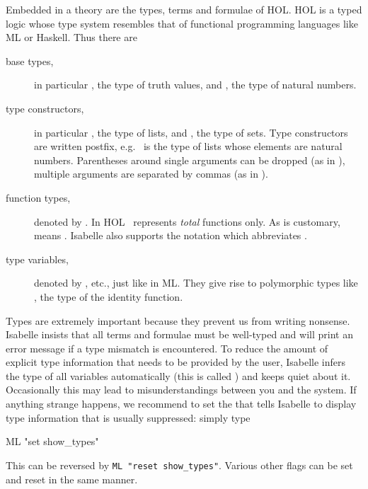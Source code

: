 Embedded in a theory are the types, terms and formulae of HOL. HOL is a typed
logic whose type system resembles that of functional programming languages
like ML or Haskell. Thus there are
\begin{description}
\item[base types,] in particular , the type of truth values,
and , the type of natural numbers.
\item[type constructors,] in particular , the type of
lists, and , the type of sets. Type constructors are written
postfix, e.g.\  is the type of lists whose elements are
natural numbers. Parentheses around single arguments can be dropped (as in
), multiple arguments are separated by commas (as in
).
\item[function types,] denoted by \isasymFun{}.
  In HOL \isasymFun\ represents \emph{total} functions only. As is customary,
   means
  . Isabelle also
  supports the notation 
  which abbreviates .
\item[type variables,]
  denoted by ,  etc., just like in ML. They give rise
  to polymorphic types like , the type of the identity
  function.
\end{description}
\begin{warn}
  Types are extremely important because they prevent us from writing
  nonsense.  Isabelle insists that all terms and formulae must be well-typed
  and will print an error message if a type mismatch is encountered. To
  reduce the amount of explicit type information that needs to be provided by
  the user, Isabelle infers the type of all variables automatically (this is
  called ) and keeps quiet about it. Occasionally
  this may lead to misunderstandings between you and the system. If anything
  strange happens, we recommend to set the 
   that tells Isabelle to display type information
  that is usually suppressed: simply type
\begin{ttbox}
ML "set show_types"
\end{ttbox}

\noindent
This can be reversed by \texttt{ML "reset show_types"}. Various other flags
can be set and reset in the same manner.
\end{warn}



